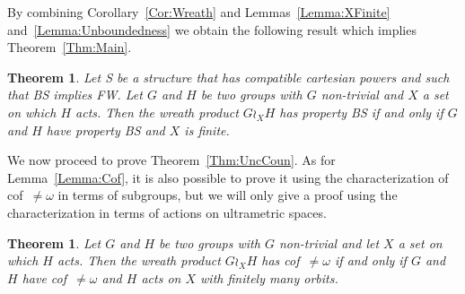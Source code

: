 \documentclass[a4paper]{article}
\newtheorem{thm}[lem]{Theorem}
\theoremstyle{definition}
\begin{document}
%
%
By combining Corollary~\ref{Cor:Wreath} and Lemmas~\ref{Lemma:XFinite} and~\ref{Lemma:Unboundedness} we obtain the following result which implies Theorem~\ref{Thm:Main}.
%
%
\begin{thm}\label{Thm:Technic}
Let S be a structure that has compatible cartesian powers and such that BS implies FW.
Let $G$ and $H$ be two groups with $G$ non-trivial and $X$ a set on which $H$ acts. Then the wreath product $G \wr_X H$ has property BS if and only if $G$ and $H$ have property BS and $X$ is finite.
\end{thm}
%
%
We now proceed to prove Theorem~\ref{Thm:UncCoun}.
As for Lemma~\ref{Lemma:Cof}, it is also possible to prove it using the characterization of cof~$\neq\omega$ in terms of subgroups, but we will only give a proof using the characterization in terms of actions on ultrametric spaces.
%
%
\begin{thm}
Let $G$ and $H$ be two groups with $G$ non-trivial and let $X$ a set on which $H$ acts. Then the wreath product $G \wr_X H$ has cof~$\neq\omega$ if and only if $G$ and $H$ have cof~$\neq\omega$ and $H$ acts on $X$ with finitely many orbits.
\end{thm}
\end{document}
